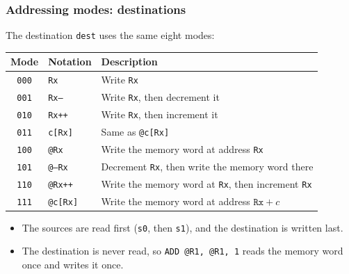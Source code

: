 \documentclass{beamer}
\newcommand{\code}[1]{\texttt{#1}}
\begin{document}
   \begin{frame}
    \frametitle{Addressing modes: destinations}
    The destination \code{dest} uses the same eight modes:
    {\small
    \begin{center}
     \begin{tabular}{|c|l|l|}
      \hline
       Mode&Notation&Description\\
      \hline
       \code{000}&\code{Rx}&Write \code{Rx}\\
       \code{001}&\code{Rx--}&Write \code{Rx}, then decrement it\\
       \code{010}&\code{Rx++}&Write \code{Rx}, then increment it\\
       \code{011}&\code{c[Rx]}&Same as \code{@c[Rx]}\\
       \code{100}&\code{@Rx}&Write the memory word at address \code{Rx}\\
       \code{101}&\code{@--Rx}&Decrement \code{Rx}, then write the
        memory word there\\
       \code{110}&\code{@Rx++}&Write the memory word at \code{Rx}, then
        increment \code{Rx}\\
       \code{111}&\code{@c[Rx]}&Write the memory word at address
        $\code{Rx} + c$\\
      \hline
     \end{tabular}
    \end{center}
    }
    \begin{itemize}
     \item The sources are read first (\code{s0}, then \code{s1}), and
      the destination is written last.
     \item The destination is never read, so \code{ADD @R1, @R1, 1} reads
      the memory word once and writes it once.
    \end{itemize}
   \end{frame}
%
\end{document}
